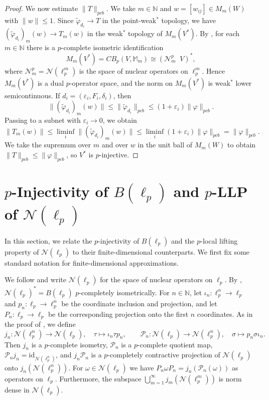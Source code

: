 \documentclass[12pt]{article}
\newcommand{\pcb}{pcb}
\newcommand{\CBp}{CB_p}
\newcommand{\otimesp}{\mathop{\overset{\wedge p}{\otimes}}}
\begin{document}
\begin{proof}
We now estimate $\|T\|_{\pcb}$. We take $m\in\mathbb{N}$ and $w=[w_{ij}]\in M_m(W)$ with $\|w\|\leq 1$.
Since $\widetilde{\varphi}_{d_i}\to T$ in the point-weak$^*$ topology, we have
$(\widetilde{\varphi}_{d_i})_m(w)\to T_m(w)$ in the weak$^*$ topology of $M_m(V^*)$.
By \cite[Section~5]{Daws2007}, for each $m\in\mathbb{N}$ there is a
$p$-complete isometric identification
\[
M_m(V^*)=\CBp(V,\mathbb{M}_m)\cong (\mathcal{N}_m^p\otimesp V)^*,
\]
where $\mathcal{N}_m^p=\mathcal{N}(\ell_p^m)$ is the space of nuclear operators on
$\ell_p^m$.
Hence $M_m(V^*)$ is a dual $p$-operator space, and the norm on $M_m(V^*)$
is weak$^*$ lower semicontinuous.
If $d_i=(\varepsilon_i,F_i,\delta_i)$, then
\[
        \|(\widetilde{\varphi}_{d_i})_m(w)\|
        \leq\|\widetilde{\varphi}_{d_i}\|_{\pcb}
        \leq(1+\varepsilon_i)\|\varphi\|_{\pcb}.
\]
Passing to a subnet with $\varepsilon_i\to 0$, we obtain
\[
        \|T_m(w)\|\leq\liminf_i\|(\widetilde{\varphi}_{d_i})_m(w)\|
        \leq\liminf_i(1+\varepsilon_i)\|\varphi\|_{\pcb}
        =\|\varphi\|_{\pcb}.
\]
We take the supremum over $m$ and over $w$ in the unit ball of $M_m(W)$
to obtain $\|T\|_{\pcb}\leq\|\varphi\|_{\pcb}$, so $V^*$ is
$p$-injective.
\end{proof}



\section{$p$-Injectivity of $B(\ell_p)$ and $p$-LLP of $\mathcal{N}(\ell_p)$}

In this section, we relate the $p$-injectivity of $B(\ell_p)$ and the $p$-local lifting property of $\mathcal{N}(\ell_p)$ to their finite-dimensional counterparts. We first fix some standard notation for finite-dimensional approximations.

We follow \cite{Daws2007} and write $\mathcal{N}(\ell_p)$ for the space of nuclear
operators on $\ell_p$.
By \cite[Lemma~5.1]{Daws2007}, $\mathcal{N}(\ell_p)^{*}=B(\ell_p)$ $p$-completely isometrically.
For $n\in\mathbb{N}$, let $\iota_n:\ell_p^n\to\ell_p$ and $p_n:\ell_p\to\ell_p^n$ be the
coordinate inclusion and projection, and let $P_n:\ell_p\to\ell_p$ be the
corresponding projection onto the first $n$ coordinates.
As in the proof of \cite[Proposition~5.2]{Daws2007}, we define
\[
        j_n:\mathcal{N}(\ell_p^n)\to \mathcal{N}(\ell_p),\quad \tau\mapsto \iota_n\tau p_n,
        \qquad
        \mathcal{P}_n:\mathcal{N}(\ell_p)\to \mathcal{N}(\ell_p^n),\quad \sigma\mapsto p_n\sigma\iota_n.
\]
Then $j_n$ is a $p$-complete isometry, $\mathcal{P}_n$ is a $p$-complete quotient map,
$\mathcal{P}_n j_n=\mathrm{id}_{\mathcal{N}(\ell_p^n)}$, and $j_n\mathcal{P}_n$ is a $p$-completely contractive projection of $\mathcal{N}(\ell_p)$ onto
$j_n(\mathcal{N}(\ell_p^n))$.
For $\omega\in \mathcal{N}(\ell_p)$ we have $P_n\omega P_n=j_n(\mathcal{P}_n(\omega))$ as
operators on $\ell_p$.
Furthermore, the subspace $\bigcup_{m=1}^\infty j_m(\mathcal{N}(\ell_p^m))$ is norm dense in $\mathcal{N}(\ell_p)$.
\end{document}
